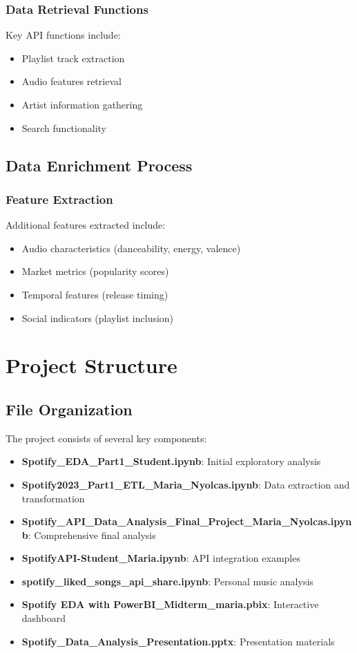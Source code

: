 \documentclass[12pt,a4paper]{article}
\begin{document}
\subsubsection{Data Retrieval Functions}
Key API functions include:
\begin{itemize}
    \item Playlist track extraction
    \item Audio features retrieval
    \item Artist information gathering
    \item Search functionality
\end{itemize}

\subsection{Data Enrichment Process}
\subsubsection{Feature Extraction}
Additional features extracted include:
\begin{itemize}
    \item Audio characteristics (danceability, energy, valence)
    \item Market metrics (popularity scores)
    \item Temporal features (release timing)
    \item Social indicators (playlist inclusion)
\end{itemize}

\section{Project Structure}

\subsection{File Organization}
The project consists of several key components:
\begin{itemize}
    \item \textbf{Spotify\_EDA\_Part1\_Student.ipynb}: Initial exploratory analysis
    \item \textbf{Spotify2023\_Part1\_ETL\_Maria\_Nyolcas.ipynb}: Data extraction and transformation
    \item \textbf{Spotify\_API\_Data\_Analysis\_Final\_Project\_Maria\_Nyolcas.ipynb}: Comprehensive final analysis
    \item \textbf{SpotifyAPI-Student\_Maria.ipynb}: API integration examples
    \item \textbf{spotify\_liked\_songs\_api\_share.ipynb}: Personal music analysis
    \item \textbf{Spotify EDA with PowerBI\_Midterm\_maria.pbix}: Interactive dashboard
    \item \textbf{Spotify\_Data\_Analysis\_Presentation.pptx}: Presentation materials
\end{itemize}
\end{document}
